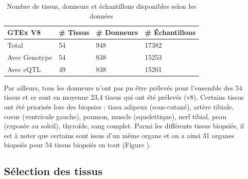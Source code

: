 \begin{table}[h]
\centering
\begin{tabular}{llll}
\textbf{GTEx V8} & \textbf{\# Tissus} & \textbf{\# Donneurs} & \textbf{\# Échantillons} \\ \hline
Total            & 54                 & 948                  & 17382                    \\
Avec Genotype    & 54                 & 838                  & 15253                    \\
Avec eQTL        & 49                 & 838                  & 15201                   
\end{tabular}
\caption{Nombre de tissus, donneurs et échantillons disponibles selon les données}
\label{table:gtex_sample_tissues_donnor}
\end{table}

Par ailleurs, tous les donneurs n'ont pas pu être prélevés pour l'ensemble des 54 tissus et ce sont en moyenne 23,4 tissus qui ont été prélevés (v8). Certains tissus ont été priorisés lors des biopsies : tissu adipeux (sous-cutané), artère tibiale, coeur (ventricule gauche), poumon, muscle (squelettique), nerf tibial, peau (exposée au soleil), thyroïde, sang complet. Parmi les différents tissus biopsiés, il est à noter que certains sont issus d'un même organe et on a ainsi 31 organes biopsiés pour 54 tissus biopsiés en tout (Figure ).



\subsection{Sélection des tissus}


